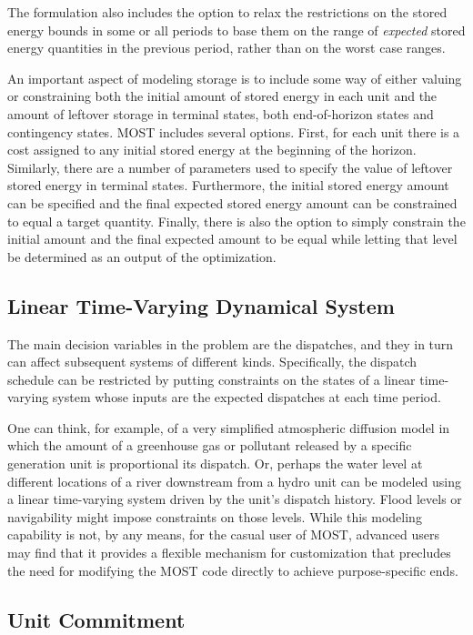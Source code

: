 \documentclass[12pt]{article}
\newcommand{\most}[0]{{MOST}}
\numberwithin{equation}{section}
\numberwithin{table}{section}
\numberwithin{figure}{section}
\begin{document}
The formulation also includes the option to relax the restrictions on the stored energy bounds in some or all periods to base them on the range of \emph{expected} stored energy quantities in the previous period, rather than on the worst case ranges.

An important aspect of modeling storage is to include some way of either valuing or constraining both the initial amount of stored energy in each unit and the amount of leftover storage in terminal states, both end-of-horizon states and contingency states. \most{} includes several options. First, for each unit there is a cost assigned to any initial stored energy at the beginning of the horizon. Similarly, there are a number of parameters used to specify the value of leftover stored energy in terminal states. Furthermore, the initial stored energy amount can be specified and the final expected stored energy amount can be constrained to equal a target quantity. Finally, there is also the option to simply constrain the initial amount and the final expected amount to be equal while letting that level be determined as an output of the optimization.
 
\subsection{Linear Time-Varying Dynamical System}

The main decision variables in the problem are the dispatches, and they in turn can affect subsequent systems of different kinds.
Specifically, the dispatch schedule can be restricted by putting constraints on the states of a linear time-varying system whose inputs are the expected dispatches at each time period.

One can think, for example, of a very simplified atmospheric diffusion model in which the amount of a greenhouse gas or pollutant released by a specific generation unit is proportional its dispatch.
Or, perhaps the water level at different locations of a river downstream from a hydro unit can be modeled using a linear time-varying system driven by the unit's dispatch history.
Flood levels or navigability might impose constraints on those levels.
While this modeling capability is not, by any means, for the casual user of \most{}, advanced users may find that it provides a flexible mechanism for customization that precludes the need for modifying the \most{} code directly to achieve purpose-specific ends.

\subsection{Unit Commitment}
\end{document}
